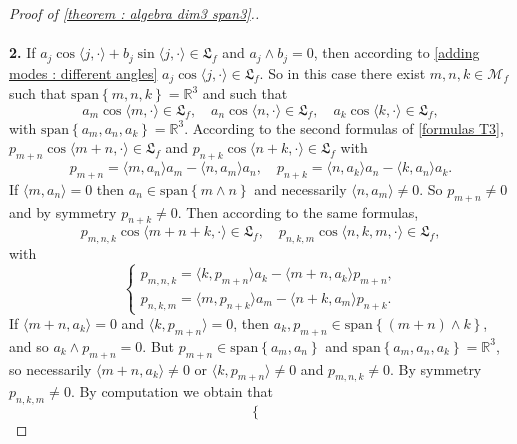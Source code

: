 \documentclass[10pt,a4paper]{amsart}
\newcommand{\M}{{\mathcal M}}
\newcommand{\R}{{\mathbb R}}
\newcommand{\la}{\langle}
\newcommand{\ra}{\rangle}
\newcommand{\we}{\wedge}
\begin{document}
\begin{proof}[Proof of \cref{theorem : algebra dim3 span3}.]
    \\ \\
    \textbf{2.} If $a_j \cos \la j,\cdot \ra +b_j \sin \la j,\cdot \ra \in \mathfrak{L}_f$ and $a_j \we b_j=0$, then according to \cref{adding modes : different angles} $a_j \cos \la j,\cdot \ra \in \mathfrak{L}_f$. So in this case there exist $m,n,k\in \M_f$ such that $\mathrm{span} \left\{m,n,k\right\}=\R^3$ and such that
    \begin{equation*}
        a_m \cos \la m,\cdot \ra \in \mathfrak{L}_f, \quad a_n \cos \la n,\cdot \ra \in \mathfrak{L}_f, \quad a_k \cos \la k,\cdot \ra \in \mathfrak{L}_f,   
    \end{equation*}
    with $\mathrm{span} \left\{a_m,a_n,a_k\right\}=\R^3$. According to the second formulas of \cref{formulas T3}, $p_{m+n}\cos \la m+n,\cdot \ra\in \mathfrak{L}_f$ and $p_{n+k}\cos \la n+k,\cdot \ra \in \mathfrak{L}_f$ with 
    \begin{equation*}
        p_{m+n}= \la m,a_n \ra a_m - \la n,a_m \ra a_n, \quad p_{n+k}=\la n,a_k \ra a_n - \la k,a_n \ra a_k.
    \end{equation*}
    If $\la m,a_n\ra =0$ then $a_n \in \mathrm{span} \left\{ m\we n \right\}$ and necessarily $\la n,a_m\ra \neq 0$. So $p_{m+n}\neq 0$ and by symmetry $p_{n+k}\neq 0$.
    Then according to the same formulas, 
    \begin{equation*}
        p_{m,n,k}\cos \la m+n+k,\cdot \ra \in \mathfrak{L}_f, \quad p_{n,k,m}\cos \la n,k,m, \cdot \ra \in \mathfrak{L}_f,
    \end{equation*}
    with
    \begin{equation*}
        \left\{\begin{array}{ll}
             p_{m,n,k}=\la k,p_{m+n}\ra a_k -\la m+n,a_k \ra p_{m+n},  \\
             p_{n,k,m}=\la m,p_{n+k} \ra a_m - \la n+k,a_m\ra p_{n+k}.
        \end{array}\right.
    \end{equation*}
    If $\la m+n ,a_k \ra=0$ and $\la k,p_{m+n}\ra=0$, then $a_k,p_{m+n}\in \mathrm{span} \left\{(m+n)\we k\right\}$, and so $a_k \we p_{m+n}=0$. But $p_{m+n}\in \mathrm{span} \left\{a_m,a_n\right\}$ and $\mathrm{span} \left\{a_m,a_n,a_k\right\}=\R^3$, so necessarily $\la m+n,a_k \ra \neq 0$ or $\la k,p_{m+n}\ra \neq 0$ and $p_{m,n,k}\neq 0$. By symmetry $p_{n,k,m}\neq 0$. By computation we obtain that 
    \begin{equation*}
        \left\{\begin{array}{ll}

\end{array}
\end{equation*}
\end{proof}
\end{document}
